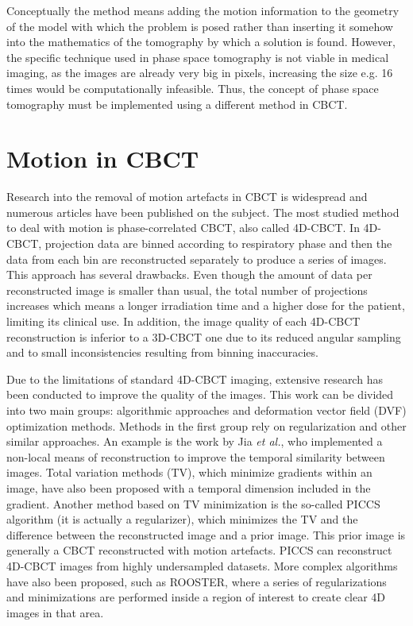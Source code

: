  Conceptually the method means adding the motion information to the geometry of the model with which the problem is posed rather than inserting it somehow into the mathematics of the tomography by which a solution is found. However, the specific technique used in phase space tomography is not viable in medical imaging, as the images are already very big in pixels, increasing the size e.g. 16 times would be computationally infeasible. Thus, the concept of phase space tomography must be implemented using a different method in CBCT.

\section{Motion in CBCT}
 Research into the removal of motion artefacts in CBCT is widespread and numerous articles have been published on the subject.  The most studied method to deal with motion is phase-correlated CBCT, also called 4D-CBCT\cite{sonke2005respiratory}\cite{thomas2006}\cite{li2006four}\cite{Pengpan2012246}\cite{t2016first}.  In 4D-CBCT, projection data are binned according to respiratory phase and then the data from each bin are reconstructed separately to produce a series of images.  This approach has several drawbacks.  Even though the amount of data per reconstructed image is smaller than usual, the total number of projections increases which means a longer irradiation time and a higher dose for the patient, limiting its clinical use.  In addition, the image quality of each 4D-CBCT reconstruction is inferior to a 3D-CBCT one due to its reduced angular sampling and to small inconsistencies resulting from binning inaccuracies. 

Due to the limitations of standard 4D-CBCT imaging, extensive research has been conducted to improve the quality of the images.  This work can be divided into two main groups: algorithmic approaches and deformation vector field (DVF) optimization methods.  Methods in the first group rely on regularization and other similar approaches.  An example is the work by Jia \textit{et al.}\cite{jia2012}, who implemented a non-local means of reconstruction to improve the temporal similarity between images.  Total variation methods (TV)\cite{ASD_POCS}, which minimize gradients within an image, have also been proposed with a temporal dimension included in the gradient\cite{0031-9155-57-6-1517}.  Another method based on TV minimization is the so-called PICCS algorithm\cite{chen2008prior}\cite{0031-9155-53-20-006}\cite{chen2012time} (it is actually a regularizer), which minimizes the TV and the difference between the reconstructed image and a prior image.  This prior image is generally a CBCT reconstructed with motion artefacts.  PICCS can reconstruct 4D-CBCT images from highly undersampled datasets.  More complex algorithms have also been proposed, such as ROOSTER\cite{:/content/aapm/journal/medphys/41/2/10.1118/1.4860215}, where a series of regularizations and minimizations are performed inside a region of interest to create clear 4D images in that area.

